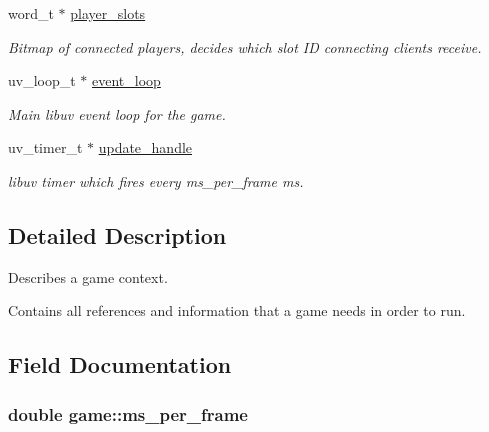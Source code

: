 \begin{DoxyCompactItemize}
\item 
\hypertarget{structgame_a596626558fdf713fe288226b8d2380ec}{}word\+\_\+t $\ast$ \hyperlink{structgame_a596626558fdf713fe288226b8d2380ec}{player\+\_\+slots}\label{structgame_a596626558fdf713fe288226b8d2380ec}

\begin{DoxyCompactList}\small\item\em Bitmap of connected players, decides which slot I\+D connecting clients receive. \end{DoxyCompactList}\item 
\hypertarget{structgame_a0f5e440f0942580f2df80cfb7f0bfaff}{}uv\+\_\+loop\+\_\+t $\ast$ \hyperlink{structgame_a0f5e440f0942580f2df80cfb7f0bfaff}{event\+\_\+loop}\label{structgame_a0f5e440f0942580f2df80cfb7f0bfaff}

\begin{DoxyCompactList}\small\item\em Main libuv event loop for the game. \end{DoxyCompactList}\item 
uv\+\_\+timer\+\_\+t $\ast$ \hyperlink{structgame_ac5f68fafd929e862fab3d748973e4268}{update\+\_\+handle}
\begin{DoxyCompactList}\small\item\em libuv timer which fires every {\itshape ms\+\_\+per\+\_\+frame} ms. \end{DoxyCompactList}\end{DoxyCompactItemize}


\subsection{Detailed Description}
Describes a game context. 

Contains all references and information that a game needs in order to run. 

\subsection{Field Documentation}
\hypertarget{structgame_aa9d50b55cf6dae7b73b4a451ba683f19}{}
\subsubsection[{ms\+\_\+per\+\_\+frame}]{\setlength{\rightskip}{0pt plus 5cm}double game\+::ms\+\_\+per\+\_\+frame}\label{structgame_aa9d50b55cf6dae7b73b4a451ba683f19}


